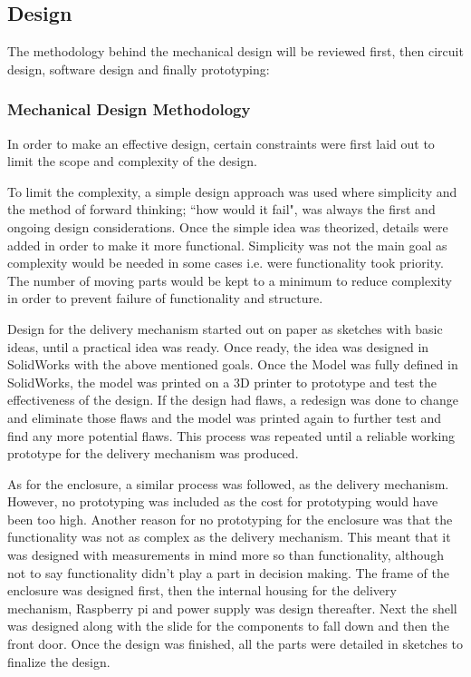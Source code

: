 \documentclass[a4paper,11pt]{article}
\numberwithin{figure}{section}
\numberwithin{table}{section}
\begin{document}
\subsection{Design}
The methodology behind the mechanical design will be reviewed first, then circuit design, software design and finally prototyping:
\subsubsection{Mechanical Design Methodology}
In order to make an effective design, certain constraints were first laid out to limit the scope and complexity of the design.

To limit the complexity, a simple design approach was used where simplicity and the method of forward thinking; ``how would it fail", was always the first and ongoing design considerations. Once the simple idea was theorized, details were added in order to make it more functional. Simplicity was not the main goal as complexity would be needed in some cases i.e. were functionality took priority. The number of moving parts would be kept to a minimum to reduce complexity in order to prevent failure of functionality and structure. 

Design for the delivery mechanism started out on paper as sketches with basic ideas, until a practical idea was ready. Once ready, the idea was designed in SolidWorks with the above mentioned goals. Once the Model was fully defined in SolidWorks, the model was printed on a 3D printer to prototype and test the effectiveness of the design. If the design had flaws, a redesign was done to change and eliminate those flaws and the model was printed again to further test and find any more potential flaws. This process was repeated until a reliable working prototype for the delivery mechanism was produced.

As for the enclosure, a similar process was followed, as the delivery mechanism. However, no prototyping was included as the cost for prototyping would have been too high. Another reason for no prototyping for the enclosure was that the functionality was not as complex as the delivery mechanism. This meant that it was designed with measurements in mind more so than functionality, although not to say functionality didn't play a part in decision making. The frame of the enclosure was designed first, then the internal housing for the delivery mechanism, Raspberry pi and power supply was design thereafter. Next the shell was designed along with the slide for the components to fall down and then the front door. Once the design was finished, all the parts were detailed in sketches to finalize the design.
\end{document}
